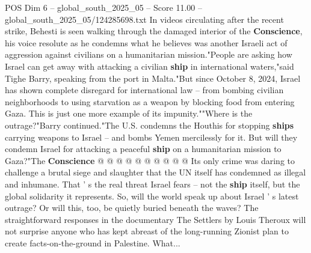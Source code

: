\begin{textsample}{POS Dim 6 – global\_south\_2025\_05 – Score 11.00 – global\_south\_2025\_05/124285698.txt}
In videos circulating after the recent strike, Behesti is seen walking through the damaged interior of the \textbf{Conscience}, his voice resolute as he condemns what he believes was another Israeli act of aggression against civilians on a humanitarian mission."People are asking how Israel can get away with attacking a civilian \textbf{ship} in international waters,"said Tighe Barry, speaking from the port in Malta."But since October 8, 2024, Israel has shown complete disregard for international law -- from bombing civilian neighborhoods to using starvation as a weapon by blocking food from entering Gaza.
This is just one more example of its impunity.""Where is the outrage?"Barry continued."The U.S. condemns the Houthis for stopping \textbf{ships} carrying weapons to Israel -- and bombs Yemen mercilessly for it.
But will they condemn Israel for attacking a peaceful \textbf{ship} on a humanitarian mission to Gaza?"The \textbf{Conscience} @ @ @ @ @ @ @ @ @ @ Its only crime was daring to challenge a brutal siege and slaughter that the UN itself has condemned as illegal and inhumane.
That ' s the real threat Israel fears -- not the \textbf{ship} itself, but the global solidarity it represents.
So, will the world speak up about Israel ' s latest outrage?
Or will this, too, be quietly buried beneath the waves?
The straightforward responses in the documentary The Settlers by Louis Theroux will not surprise anyone who has kept abreast of the long-running Zionist plan to create facts-on-the-ground in Palestine.
What...

\end{textsample}
